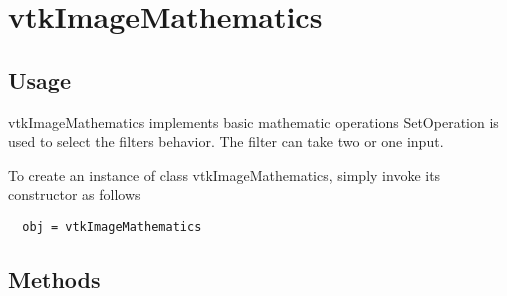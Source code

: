 \section{vtkImageMathematics}

\subsection{Usage}

 vtkImageMathematics implements basic mathematic operations SetOperation is
 used to select the filters behavior.  The filter can take two or one
 input.

To create an instance of class vtkImageMathematics, simply
invoke its constructor as follows
\begin{verbatim}
  obj = vtkImageMathematics
\end{verbatim}
\subsection{Methods}

